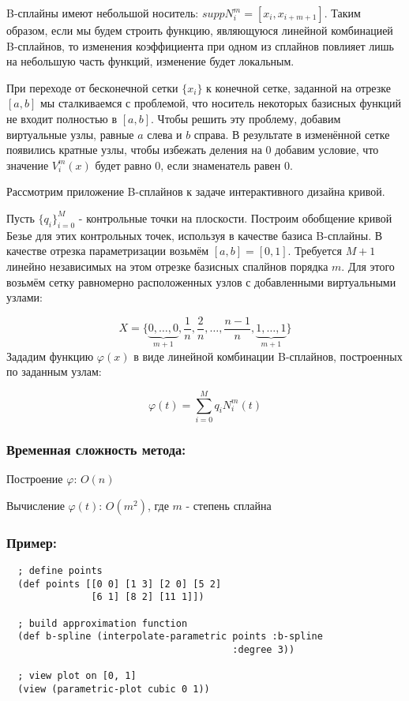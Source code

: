 B-сплайны имеют небольшой носитель: $supp N^m_i = [x_i, x_{i+m+1}]$. Таким образом, если мы будем строить функцию, являющуюся линейной комбинацией B-сплайнов, то изменения коэффициента при одном из сплайнов повлияет лишь на небольшую часть функций, изменение будет локальным.

При переходе от бесконечной сетки $\{x_i\}$ к конечной сетке, заданной на отрезке $[a, b]$ мы сталкиваемся с проблемой, что носитель некоторых базисных функций не входит полностью в $[a, b]$. Чтобы решить эту проблему, добавим виртуальные узлы, равные $a$ слева и $b$ справа. В результате в изменённой сетке появились кратные узлы, чтобы избежать деления на 0 добавим условие, что значение $V^m_i(x)$ будет равно $0$, если знаменатель равен 0.

Рассмотрим приложение B-сплайнов к задаче интерактивного дизайна кривой.

Пусть $\{q_i\}^M_{i=0}$ - контрольные точки на плоскости. Построим обобщение кривой Безье для этих контрольных точек, используя в качестве базиса B-сплайны. В качестве отрезка параметризации возьмём $[a, b] = [0, 1]$. Требуется $M + 1$ линейно независимых на этом отрезке базисных спалйнов порядка $m$. Для этого возьмём сетку равномерно расположенных узлов с добавленными виртуальными узлами:

\begin{equation}
  X = \{\underbrace{0, \ldots, 0}_{m+1}, \frac{1}{n},\frac{2}{n}, \ldots, \frac{n-1}{n}, \underbrace{1, \ldots, 1}_{m+1}\}
\end{equation}
Зададим функцию $\varphi(x)$ в виде линейной комбинации B-сплайнов, построенных по заданным узлам:

\begin{equation}
  \varphi(t) = \sum_{i=0}^M q_i N^m_i(t)
\end{equation}

\subsubsection{Временная сложность метода:}

Построение $\varphi$: $O(n)$

Вычисление $\varphi(t)$: $O(m^2)$, где $m$ - степень сплайна


\subsubsection{Пример:}

\begin{samepage}
\begin{verbatim}
  ; define points
  (def points [[0 0] [1 3] [2 0] [5 2]
               [6 1] [8 2] [11 1]])

  ; build approximation function
  (def b-spline (interpolate-parametric points :b-spline
                                        :degree 3))

  ; view plot on [0, 1]
  (view (parametric-plot cubic 0 1))
\end{verbatim}
\end{samepage}

